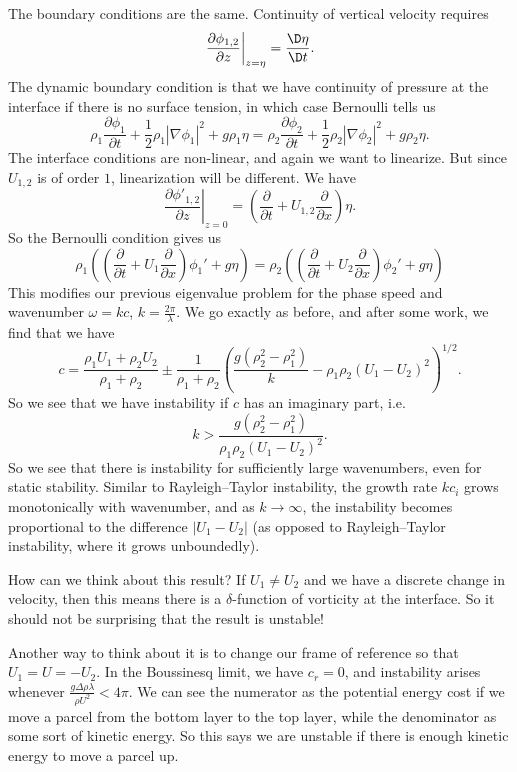 \documentclass[a4paper]{article}
\begin{document}
The boundary conditions are the same. Continuity of vertical velocity requires
\[
  \left.\frac{\partial \phi_{1, 2}}{\partial z} \right|_{z = \eta} = \frac{\D \eta}{\D t}.
\]
The dynamic boundary condition is that we have continuity of pressure at the interface if there is no surface tension, in which case Bernoulli tells us
\[
  \rho_1 \frac{\partial \phi_1}{\partial t} + \frac{1}{2} \rho_1 |\nabla \phi_1|^2 + g \rho_1 \eta = \rho_2 \frac{\partial \phi_2}{\partial t} + \frac{1}{2} \rho_2 |\nabla \phi_2|^2 + g \rho_2 \eta.
\]
The interface conditions are non-linear, and again we want to linearize. But since $U_{1, 2}$ is of order $1$, linearization will be different. We have
\[
  \left. \frac{\partial \phi'_{1, 2}}{\partial z} \right|_{z = 0} = \left(\frac{\partial}{\partial t} + U_{1, 2} \frac{\partial}{\partial x}\right)\eta.
\]
So the Bernoulli condition gives us
\[
  \rho_1 \left(\left(\frac{\partial}{\partial t} + U_1 \frac{\partial}{\partial x}\right) \phi_1' + g \eta\right) = \rho_2 \left(\left(\frac{\partial}{\partial t} + U_2 \frac{\partial}{\partial x}\right) \phi_2' + g \eta\right)
\]
This modifies our previous eigenvalue problem for the phase speed and wavenumber $\omega = k c$, $k = \frac{2\pi}{\lambda}$. We go exactly as before, and after some work, we find that we have
\[
  c = \frac{\rho_1 U_1 + \rho_2 U_2}{\rho_1 + \rho_2} \pm \frac{1}{\rho_1 + \rho_2} \left(\frac{g (\rho_2^2 - \rho_1^2)}{k} - \rho_1 \rho_2 (U_1 - U_2)^2\right)^{1/2}.
\]
So we see that we have instability if $c$ has an imaginary part, i.e.
\[
  k > \frac{g (\rho_2^2 - \rho_1^2)}{\rho_1 \rho_2 (U_1 - U_2)^2}.
\]
So we see that there is instability for sufficiently large wavenumbers, even for static stability. Similar to Rayleigh--Taylor instability, the growth rate $k c_i$ grows monotonically with wavenumber, and as $k \to \infty$, the instability becomes proportional to the difference $|U_1 - U_2|$ (as opposed to Rayleigh--Taylor instability, where it grows unboundedly). %

How can we think about this result? If $U_1 \not= U_2$ and we have a discrete change in velocity, then this means there is a $\delta$-function of vorticity at the interface. So it should not be surprising that the result is unstable!

Another way to think about it is to change our frame of reference so that $U_1 = U = - U_2$. In the Boussinesq limit, we have $c_r = 0$, and instability arises whenever $\frac{g \Delta \rho \lambda}{\rho U^2} < 4\pi$. We can see the numerator as the potential energy cost if we move a parcel from the bottom layer to the top layer, while the denominator as some sort of kinetic energy. So this says we are unstable if there is enough kinetic energy to move a parcel up.
\end{document}
